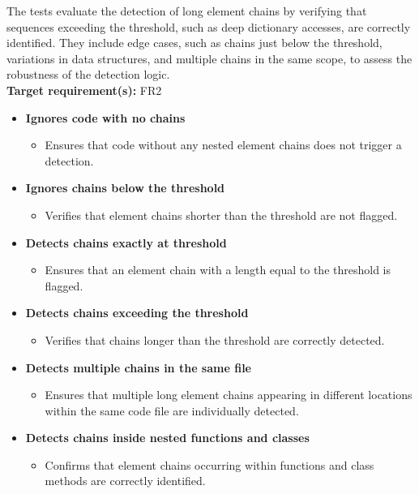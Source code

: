 \documentclass[12pt, titlepage]{article}
\begin{document}
\begin{enumerate}[label={\bf \textcolor{Maroon}{test-SRT-\arabic*}}, wide=0pt, font=\itshape]
\noindent The tests evaluate the detection of long element chains by verifying that sequences exceeding the threshold, such as deep dictionary accesses, are correctly identified. They include edge cases, such as chains just below the threshold, variations in data structures, and multiple chains in the same scope, to assess the robustness of the detection logic.\\

\noindent\textbf{Target requirement(s):} FR2~\cite{SRS} \\

\begin{itemize}
  \item \textbf{Ignores code with no chains}
  \begin{itemize}
      \item Ensures that code without any nested element chains does not trigger a detection.
  \end{itemize}

  \item \textbf{Ignores chains below the threshold}
  \begin{itemize}
      \item Verifies that element chains shorter than the threshold are not flagged.
  \end{itemize}

  \item \textbf{Detects chains exactly at threshold}
  \begin{itemize}
      \item Ensures that an element chain with a length equal to the threshold is flagged.
  \end{itemize}

  \item \textbf{Detects chains exceeding the threshold}
  \begin{itemize}
      \item Verifies that chains longer than the threshold are correctly detected.
  \end{itemize}

  \item \textbf{Detects multiple chains in the same file}
  \begin{itemize}
      \item Ensures that multiple long element chains appearing in different locations within the same code file are individually detected.
  \end{itemize}

  \item \textbf{Detects chains inside nested functions and classes}
  \begin{itemize}
      \item Confirms that element chains occurring within functions and class methods are correctly identified.
  \end{itemize}


\end{itemize}
\end{enumerate}
\end{document}
